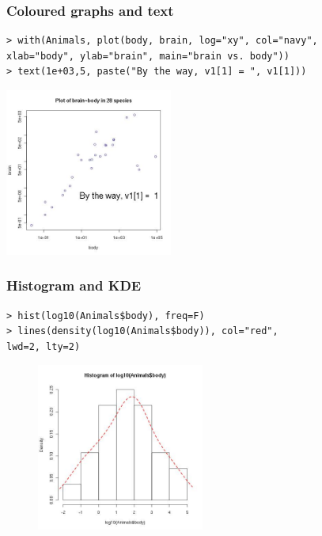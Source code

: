 \documentclass{beamer}
\begin{document}

\begin{frame}[fragile]

 \frametitle{Coloured graphs and text}
 \begin{footnotesize}
\begin{verbatim}
> with(Animals, plot(body, brain, log="xy", col="navy",
xlab="body", ylab="brain", main="brain vs. body"))
> text(1e+03,5, paste("By the way, v1[1] = ", v1[1]))
 \end{verbatim}
\end{footnotesize}
 \vspace{-0.7cm}
 \begin{center}
\includegraphics[height=5.5cm]{figs/plot.jpg}  
 \end{center}

\end{frame}


\begin{frame}[fragile]
  
\frametitle{Histogram and KDE}
 \begin{footnotesize}
   \begin{verbatim}
> hist(log10(Animals$body), freq=F)
> lines(density(log10(Animals$body)), col="red", 
lwd=2, lty=2)
   \end{verbatim}
 \end{footnotesize}
\vspace{-1cm}
\begin{figure}
\includegraphics[height=5.5cm]{figs/hist.jpg}
\end{figure}

\end{frame}
\end{document}
